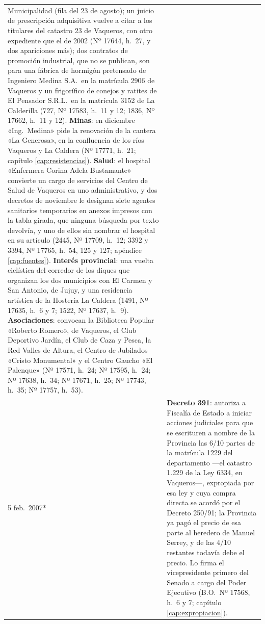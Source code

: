 \begin{longtable}{@{}p{2.7cm}p{10.3cm}@{}}
Municipalidad (fila del 23 de agosto); un juicio de prescripción adquisitiva vuelve a citar a los titulares del catastro 23 de Vaqueros, con otro expediente que el de 2002 (Nº 17644, h.\ 27, y dos apariciones más); dos contratos de promoción industrial, que no se publican, son para una fábrica de hormigón pretensado de Ingeniero Medina S.A.\ en la matrícula 2906 de Vaqueros y un frigorífico de conejos y ratites de El Pensador S.R.L.\ en la matrícula 3152 de La Calderilla (727, Nº 17583, h.\ 11 y 12; 1836, Nº 17662, h.\ 11 y 12). \textbf{Minas}: en diciembre «Ing.\ Medina» pide la renovación de la cantera «La Generosa», en la confluencia de los ríos Vaqueros y La Caldera (Nº 17771, h.\ 21; capítulo \ref{cap:resistencias}). \textbf{Salud}: el hospital «Enfermera Corina Adela Bustamante» convierte un cargo de servicios del Centro de Salud de Vaqueros en uno administrativo, y dos decretos de noviembre le designan siete agentes sanitarios temporarios en anexos impresos con la tabla girada, que ninguna búsqueda por texto devolvía, y uno de ellos sin nombrar el hospital en su artículo (2445, Nº 17709, h.\ 12; 3392 y 3394, Nº 17765, h.\ 54, 125 y 127; apéndice \ref{cap:fuentes}). \textbf{Interés provincial}: una vuelta ciclística del corredor de los diques que organizan los dos municipios con El Carmen y San Antonio, de Jujuy, y una residencia artística de la Hostería La Caldera (1491, Nº 17635, h.\ 6 y 7; 1522, Nº 17637, h.\ 9). \textbf{Asociaciones}: convocan la Biblioteca Popular «Roberto Romero», de Vaqueros, el Club Deportivo Jardín, el Club de Caza y Pesca, la Red Valles de Altura, el Centro de Jubilados «Cristo Monumental» y el Centro Gaucho «El Palenque» (Nº 17571, h.\ 24; Nº 17595, h.\ 24; Nº 17638, h.\ 34; Nº 17671, h.\ 25; Nº 17743, h.\ 35; Nº 17757, h.\ 53). \\
5 feb.\ 2007* & \textbf{Decreto 391}: autoriza a Fiscalía de Estado a iniciar acciones judiciales para que se escrituren a nombre de la Provincia las 6/10 partes de la matrícula 1229 del departamento ---el catastro 1.229 de la Ley 6334, en Vaqueros---, expropiada por esa ley y cuya compra directa se acordó por el Decreto 250/91; la Provincia ya pagó el precio de esa parte al heredero de Manuel Serrey, y de las 4/10 restantes todavía debe el precio. Lo firma el vicepresidente primero del Senado a cargo del Poder Ejecutivo (B.O.\ Nº 17568, h.\ 6 y 7; capítulo \ref{cap:expropiacion}). \\

\end{longtable}
